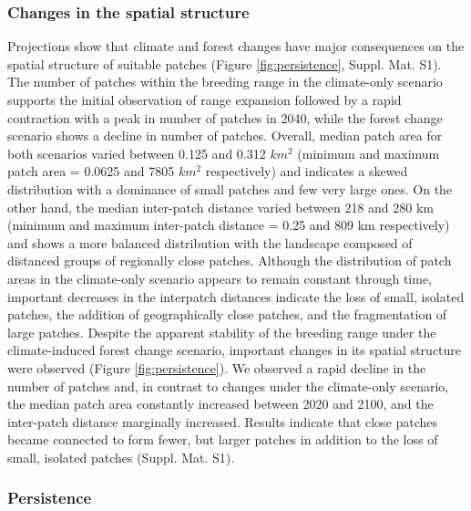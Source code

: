 \documentclass[12pt]{article}
\begin{document}
\hypertarget{changes-in-the-spatial-structure}{%
\subsubsection{Changes in the spatial
structure}\label{changes-in-the-spatial-structure}}

Projections show that climate and forest changes have major consequences
on the spatial structure of suitable patches (Figure
\ref{fig:persistence}, Suppl. Mat. S1). The number of patches within the
breeding range in the climate-only scenario supports the initial
observation of range expansion followed by a rapid contraction with a
peak in number of patches in 2040, while the forest change scenario
shows a decline in number of patches. Overall, median patch area for
both scenarios varied between 0.125 and 0.312 \(km^2\) (minimum and
maximum patch area = 0.0625 and 7805 \(km^2\) respectively) and
indicates a skewed distribution with a dominance of small patches and
few very large ones. On the other hand, the median inter-patch distance
varied between 218 and 280 km (minimum and maximum inter-patch distance
= 0.25 and 809 km respectively) and shows a more balanced distribution
with the landscape composed of distanced groups of regionally close
patches. Although the distribution of patch areas in the climate-only
scenario appears to remain constant through time, important decreases in
the interpatch distances indicate the loss of small, isolated patches,
the addition of geographically close patches, and the fragmentation of
large patches. Despite the apparent stability of the breeding range
under the climate-induced forest change scenario, important changes in
its spatial structure were observed (Figure \ref{fig:persistence}). We
observed a rapid decline in the number of patches and, in contrast to
changes under the climate-only scenario, the median patch area
constantly increased between 2020 and 2100, and the inter-patch distance
marginally increased. Results indicate that close patches became
connected to form fewer, but larger patches in addition to the loss of
small, isolated patches (Suppl. Mat. S1).

\hypertarget{persistence}{%
\subsubsection{Persistence}\label{persistence}}
\end{document}
